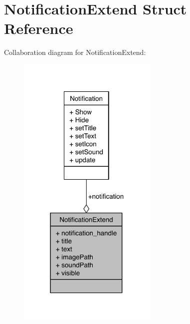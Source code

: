 \section{Notification\-Extend Struct Reference}
\label{structNotificationExtend}


Collaboration diagram for Notification\-Extend\-:\nopagebreak
\begin{figure}[H]
\begin{center}
\leavevmode
\includegraphics[width=190pt]{structNotificationExtend__coll__graph}
\end{center}
\end{figure}
